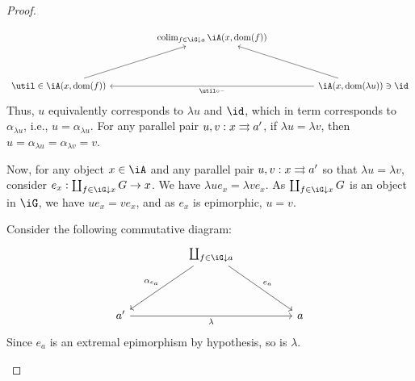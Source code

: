 \documentclass{zett}
\begin{document}
\begin{proof}
\begin{node}
    \[\begin{tikzcd}
	&& {\colim_{f \in \iG \dn a}\iA(x,\dom(f))} \\
	\\
	{\util \in \iA(x,\dom(f))} &&&& {\iA(x,\dom(\lambda u)) \ni \id}
	\arrow[from=3-1, to=1-3]
	\arrow["{\util \circ \blank}", from=3-5, to=3-1]
	\arrow[from=3-5, to=1-3]
      \end{tikzcd}\]
    Thus, $u$ equivalently corresponds to $\lambda u$ and $\id$, which in term corresponds to $\alpha_{\lambda u}$, i.e., $u = \alpha_{\lambda u}$.
    For any parallel pair $u, v : x \rightrightarrows a'$, if $\lambda u = \lambda v$, then $u = \alpha_{\lambda u} = \alpha_{\lambda v} = v$.
  \end{node}
  \begin{node}
    Now, for any object $x \in \iA$ and any parallel pair $u, v : x \rightrightarrows a'$ so that $\lambda u = \lambda v$, consider $e_{x} : \coprod_{f \in \iG \dn x}G \to x$.
    We have $\lambda ue_{x} = \lambda ve_{x}$.
    As $\coprod_{f \in \iG \dn x}G$ is an object in $\iG$, we have $ue_{x} = ve_{x}$, and as $e_{x}$ is epimorphic, $u = v$.
  \end{node}
  \begin{node}
    Consider the following commutative diagram:
    \[\begin{tikzcd}
	&& {\coprod_{f \in \iG \dn a}} \\
	\\
	{a'} &&&& a
	\arrow["{e_{a}}", from=1-3, to=3-5]
	\arrow["{\alpha_{e_{a}}}"', from=1-3, to=3-1]
	\arrow["\lambda"', from=3-1, to=3-5]
      \end{tikzcd}\]
    Since $e_{a}$ is an extremal epimorphism by hypothesis, so is $\lambda$.
  \end{node}
\end{proof}
\end{document}
